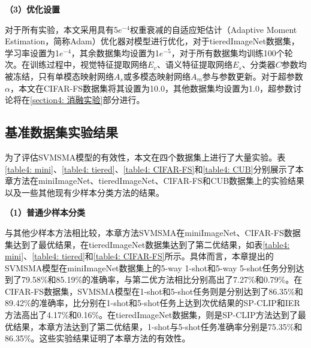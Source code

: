 \textbf{（3）优化设置}

对于所有实验，本文采用具有5$e^{-4}$权重衰减的自适应矩估计（Adaptive Moment Estimation，简称Adam）优化器对模型进行优化，对于tieredImageNet数据集，学习率设置为1$e^{-4}$，其余数据集均设置为1$e^{-5}$，对于所有数据集均训练100个轮次。在训练过程中，视觉特征提取网络$E_v$、语义特征提取网络$E_s$、分类器$C$参数均被冻结，只有单模态映射网络$A_s$或多模态映射网络$A_m$参与参数更新。对于超参数$\alpha$，本文在CIFAR-FS数据集将其设置为10.0，其他数据集均设置为1.0，超参数讨论将在\ref{section4: 消融实验}部分进行。

\subsection[\hspace{-2pt}基准数据集实验结果]{{\heiti{} \hspace{-8pt}基准数据集实验结果}}\label{section4: 基准数据集实验结果}

为了评估SVMSMA模型的有效性，本文在四个数据集上进行了大量实验。表\ref{table4: mini}、\ref{table4: tiered}、\ref{table4: CIFAR-FS}和\ref{table4: CUB}分别展示了本章方法在miniImageNet、tieredImageNet、CIFAR-FS和CUB数据集上的实验结果以及一些其他现有少样本分类方法的结果。

\textbf{（1）普通少样本分类}

与其他少样本方法相比较，本章方法SVMSMA在miniImageNet、CIFAR-FS数据集达到了最优结果，在tieredImageNet数据集达到了第二优结果，如表\ref{table4: mini}、\ref{table4: tiered}和\ref{table4: CIFAR-FS}所示。具体而言，本章提出的SVMSMA模型在miniImageNet数据集上的5-way 1-shot和5-way 5-shot任务分别达到了79.58\%和85.19\%的准确率，与第二优方法相比分别高出了7.27\%和0.79\%。在CIFAR-FS数据集，SVMSMA模型在1-shot和5-shot任务则是分别达到了86.35\%和89.42\%的准确率，比分别在1-shot和5-shot任务上达到次优结果的SP-CLIP和IER方法高出了4.17\%和0.16\%。在tieredImageNet数据集，则是SP-CLIP方法达到了最优结果，本章方法达到了第二优结果，1-shot与5-shot任务准确率分别是75.35\%和86.35\%。这些实验结果证明了本章方法的有效性。

